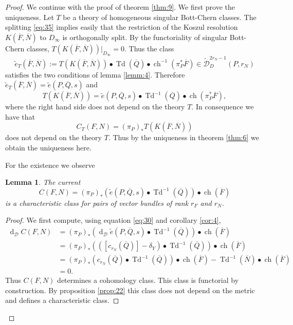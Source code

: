 \documentclass[10pt,twoside]{article}
\numberwithin{equation}{section}
\theoremstyle{plain}
\newtheorem{lemma}[equation]{Lemma}
\theoremstyle{definition}
\DeclareMathOperator{\Td}{Td}
\DeclareMathOperator{\dd}{d}
\DeclareMathOperator{\ch}{ch}
\begin{document}
\begin{proof}
  We continue with the proof of theorem \ref{thm:9}. We first prove
  the uniqueness. Let $T$ be a
  theory of homogeneous singular Bott-Chern classes. The splitting
  \eqref{eq:35} implies easily that
  the restriction of the Koszul resolution $K(\overline F,\overline N)$ 
  to $D_{\infty}$ is orthogonally split. By the functoriality of
  singular Bott-Chern classes, $T(K(\overline
  F,\overline N))|_{D_{\infty}}=0$. Thus the class
  \begin{displaymath}
    \widetilde e_{T}(\overline F,\overline N):= T(K(\overline
    F,\overline N))\bullet \Td(\overline Q)\bullet\ch^{-1}(\pi
    _{P}^{\ast}\overline F)\in \widetilde
    {\mathcal{D}}^{2r_{N}-1}_{D}(P,r_{N})
  \end{displaymath}
  satisfies the two conditions of lemma \ref{lemm:4}. Therefore 
  $\widetilde e_{T}(\overline F,\overline N)=\widetilde e(P,\overline
  Q,s)$ and
  \begin{equation}\label{eq:73}
    T(K(\overline
    F,\overline N))= \widetilde e(P,\overline
  Q,s)\bullet \Td^{-1}(\overline Q)\bullet\ch(\pi
    _{P}^{\ast}\overline F),
  \end{equation}
  where the right hand side does not depend on the theory $T$. In
  consequence we have that
  \begin{equation}
    \label{eq:71}
    C_{T}(F,N)=(\pi _{P})_{\ast}T(K(\overline
    F,\overline N))
  \end{equation}
  does not depend on the theory $T$. Thus by the uniqueness in theorem
  \ref{thm:6} we obtain the uniqueness here.

  For the existence we observe 
  \begin{lemma}\label{lemm:6} The current 
      \begin{displaymath}
    C(F,N)=(\pi _{P})_{\ast}(\widetilde e(P,\overline
  Q,s)\bullet \Td^{-1}(\overline Q)) \bullet \ch(\overline F)
  \end{displaymath}
  is a characteristic class for pairs of vector bundles of rank
  $r_{F}$ and $r_{N}$.
  \end{lemma}
  \begin{proof}
    We first compute, using equation \eqref{eq:30} and corollary
    \ref{cor:4}, 
    \begin{align*}
      \dd_{\mathcal{D}} C(F,N)&=(\pi
      _{P})_{\ast}\left(\dd_{\mathcal{D}}\widetilde e(P,\overline 
      Q,s)\bullet \Td^{-1}(\overline Q)\right)\bullet \ch(\overline F)\\
      &=  (\pi
      _{P})_{\ast}\left(([c_{r_{N}}(\overline Q)]-\delta _{Y})\bullet
      \Td^{-1}(\overline Q)\right)\bullet 
      \ch(\overline F)\\
      &= (\pi
      _{P})_{\ast}\left(c_{r_{N}}(\overline Q)\bullet \Td^{-1}(\overline
      Q)\right) \bullet
      \ch(\overline F)
      -\Td^{-1}(\overline N)\bullet \ch(\overline F)\\
      &=0.
    \end{align*}
    Thus $C(F,N)$ determines a cohomology class. This class is
    functorial by construction. By proposition \ref{prop:22} this
    class does not depend on the metric and defines a characteristic
    class.  
  \end{proof}


\end{proof}
\end{document}
